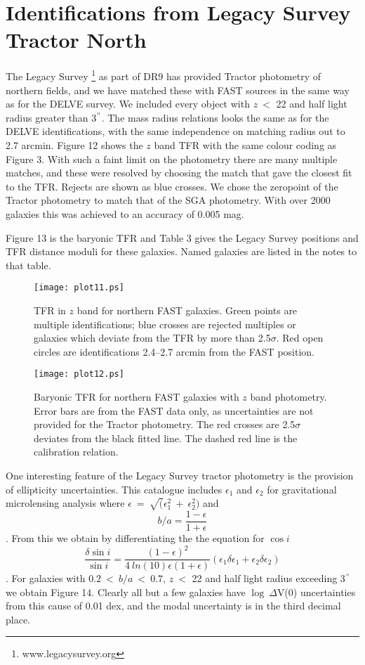 \documentclass{article}
\begin{document}
 \section{Identifications from Legacy Survey Tractor North}
 The Legacy Survey \footnote {www.legacysurvey.org} as part of DR9 has provided Tractor photometry of northern fields, and we have matched these with FAST sources in the same way as for the DELVE survey. We included every object with $z~<$ 22 and half light radius greater than 3$^"$. The mass radius relations looks the same as for the DELVE identifications, with the same independence on matching radius out to 2.7 arcmin. Figure 12 shows the $z$ band TFR with the same colour coding as Figure 3. With such a faint limit on the photometry there are many multiple matches, and these were resolved by choosing the match that gave the closest fit to the TFR. Rejects are shown as blue crosses. We chose the zeropoint of the Tractor photometry to match that of the SGA photometry. With over 2000 galaxies this was achieved to an accuracy of 0.005 mag.

 Figure 13 is the baryonic TFR and Table 3 gives the Legacy Survey positions and TFR distance moduli for these galaxies. Named galaxies are listed in the notes to that table.

\begin{figure}	
\texttt{[image: plot11.ps]}%
\caption{TFR in $z$ band for northern FAST galaxies. Green points are multiple identifications; blue crosses are rejected multiples
	or galaxies which deviate from the TFR by more than 2.5$\sigma$. Red open circles are identifications 2.4--2.7 arcmin from the FAST position.}
\end{figure}

\begin{figure}	
\texttt{[image: plot12.ps]}
\caption{Baryonic TFR for northern FAST galaxies with $z$ band photometry. Error bars are from the FAST data only, as uncertainties are not provided for the Tractor photometry. The red crosses are 2.5$\sigma$ deviates from the black fitted line. The dashed red line is the calibration relation.}
\end{figure}

One interesting feature of the Legacy Survey tractor photometry is the provision of ellipticity uncertainties. This catalogue includes $\epsilon_1$ and $\epsilon_2$ for gravitational microlensing analysis where $\epsilon ~=~ \surd (\epsilon_1^2~+~\epsilon_2^2)$ and $$b/a = \frac
{1-\epsilon}{1+\epsilon}$$. From this we obtain by differentiating the the equation for $\cos i$ $$\frac{\delta \sin i}{\sin i} =
\frac{(1-\epsilon)^2}{4~ln(10)\epsilon (1+\epsilon)} (\epsilon_1 \delta \epsilon_1 + \epsilon_2 \delta \epsilon_2)$$. For galaxies with $0.2~<~b/a~<~0.7$, $z~<$ 22  and half light radius exceeding 3$^"$ we obtain Figure 14. Clearly all but a few galaxies have $\log~\Delta$V(0) uncertainties from this cause of 0.01 dex, and the modal uncertainty is in the third decimal place.
\end{document}

